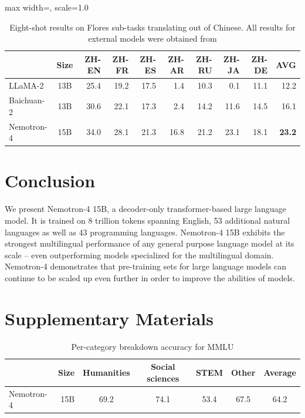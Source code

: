 \documentclass[11pt]{article}
\newcommand{\ours}{Nemotron-4}
\begin{document}
\begin{table}[H]
\centering
\begin{adjustbox}{max width=\textwidth, scale=1.0}
\begin{tabular}{lcrrrrrrrr}
\toprule
  & Size & ZH-EN & ZH-FR & ZH-ES & ZH-AR & ZH-RU & ZH-JA & ZH-DE & AVG  \\
\midrule
\multirow{1}{*}{LLaMA-2} 
& 13B & 25.4 &19.2 &17.5& 1.4& 10.3& 0.1 &11.1 &12.2  \\
\midrule
\multirow{1}{*}{Baichuan-2} 
& 13B & 30.6 & 22.1 & 17.3 & 2.4 & 14.2 & 11.6 & 14.5 & 16.1 \\
\midrule
\ours{} & 15B & 34.0 & 28.1 & 21.3 & 16.8 & 21.2 & 23.1 &	18.1 & \textbf{23.2} \\ 
\bottomrule
\end{tabular}
\end{adjustbox}
\caption{\label{tab:flores_ext} Eight-shot results on Flores sub-tasks translating out of Chinese. All results for external models were obtained from \citep{yang2023baichuan}}
\end{table}

\section{Conclusion}

We present \ours{} 15B, a decoder-only transformer-based large language model.
It is trained on 8 trillion tokens spanning English, 53 additional natural languages as well as 43 programming languages. \ours{} 15B exhibits the strongest multilingual performance of any general purpose language model at its scale -- even outperforming models specialized for the multilingual domain.
\ours{} demonstrates that pre-training sets for large language models can continue to be scaled up even further in order to improve the abilities of models. 




\FloatBarrier

\appendix

\section*{Supplementary Materials} \label{supplementary_material}

\begin{table}[H]
\centering
\begin{tabular}{lrccccc} 
\toprule
    & Size & Humanities & Social sciences & STEM & Other & Average       \\ 
\midrule
\ours{} & 15B & 69.2 & 74.1 & 53.4 & 67.5 & 64.2 \\ 
\bottomrule
\end{tabular}
\caption{\label{tab:mmlu} Per-category breakdown accuracy for MMLU }
\end{table}
\end{document}
